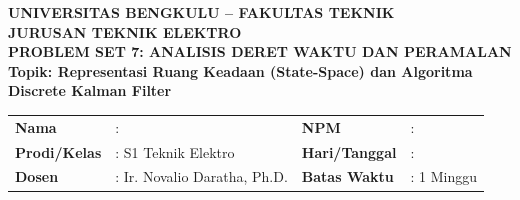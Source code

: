 \documentclass[11pt,a4paper]{article}
\begin{document}
\begin{center}
    {\large \textbf{\color{primaryblue}UNIVERSITAS BENGKULU -- FAKULTAS TEKNIK}}\\[0.1cm]
    {\large \textbf{\color{secondaryblue}JURUSAN TEKNIK ELEKTRO}}\\[0.2cm]
    {\LARGE \textbf{\color{primaryblue}PROBLEM SET 7: ANALISIS DERET WAKTU DAN PERAMALAN}}\\[0.1cm]
    {\normalsize \textbf{Topik: Representasi Ruang Keadaan (State-Space) dan Algoritma Discrete Kalman Filter}}
\end{center}

\vspace{0.1cm}

\begin{tcolorbox}[colback=boxbg,colframe=primaryblue,arc=2mm,title=\textbf{Informasi Tugas \& Identitas Mahasiswa}]
\small
\begin{tabular}{p{2.2cm}p{5.5cm}p{2.2cm}p{5.0cm}}
\textbf{Nama} & : \dotfill & \textbf{NPM} & : \dotfill \\
\textbf{Prodi/Kelas} & : S1 Teknik Elektro & \textbf{Hari/Tanggal} & : \dotfill \\
\textbf{Dosen} & : Ir. Novalio Daratha, Ph.D. & \textbf{Batas Waktu} & : 1 Minggu \\
\end{tabular}
\end{tcolorbox}

\vspace{0.2cm}
\end{document}
